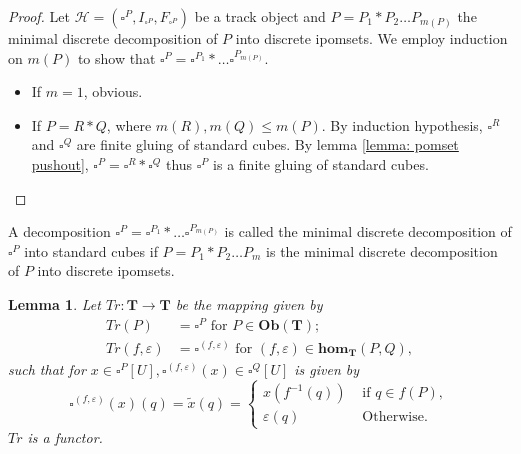 \documentclass[11pt,a4paper,oldfontcommands]{memoir}
\newcommand*{\intpom}{\TrO}
\newcommand{\TrO}{\mathbf{T}}
\newcommand*\pobj[1]{\square^{#1}}
\newtheorem{lemma}[definition]{Lemma}
\begin{document}
\begin{proof}
    Let $\mathcal{H}=( \pobj{ P}, I_{ \pobj{P}}, F_{ \pobj{P}})$ be a track object and $P=P_1*P_2 \dots P_{m(P)}$ the minimal discrete decomposition of $P$ into discrete ipomsets. We employ induction on $m(P)$ to show that $\pobj{ P}=\pobj{ P_1}* \dots \pobj{ P_{m(P)}}$.
    \begin{itemize}
        \item If $m=1$, obvious.
        \item If $P=R*Q$, where $m(R),m(Q) \leq  m(P)$. By induction hypothesis, $\pobj{ R}$ and $\pobj{ Q}$ are finite gluing of standard cubes. By lemma \ref{lemma: pomset pushout}, $\pobj{ P}= \pobj{ R}*\pobj{ Q}$ thus $\pobj{ P}$ is a finite gluing of standard cubes.
    \end{itemize}
\end{proof}
A decomposition $\pobj{ P}=\pobj{ P_1}* \dots \pobj{ P_{m(P)}}$ is called the minimal discrete decomposition of $\pobj{ P}$ into standard cubes if $P=P_1*P_2 \dots P_{m}$ is the minimal discrete decomposition of $P$ into discrete ipomsets.
\begin{lemma}
 Let $Tr: \intpom \rightarrow \TrO$ be the mapping given by 
     \begin{align*}
Tr(P)& =\square^P \text{ for } P \in \mathbf{Ob}(\intpom);  \\
Tr(f,\varepsilon)&=\square^{(f,\varepsilon)} \text{ for } (f,\varepsilon) \in \mathbf{hom}_{\intpom}(P,Q),   
\end{align*}   
such that for $x\in \square^{P}[U], \square^{(f,\varepsilon)}(x)\in \square^{Q}[U]$ is given by  \begin{equation} %
      \square^{(f,\varepsilon)}(x)(q)=
     \tilde{x}(q)= \begin{cases} x(f^{-1}(q)) & \text { if } q \in f(P), \\ \varepsilon(q) & \text { Otherwise}. \end{cases}
    \end{equation}
$Tr$ is a functor.
\end{lemma}
\end{document}
